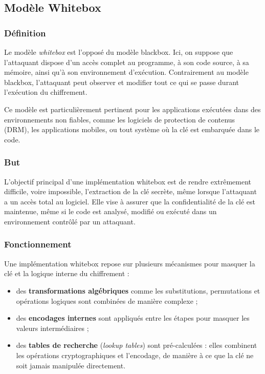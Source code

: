 \documentclass[a4paper, 10pt]{article}
\begin{document}
\vspace{0.5cm}

\subsection{Modèle Whitebox}

\subsubsection{Définition}

Le modèle \textit{whitebox} est l’opposé du modèle blackbox. Ici, on suppose que l’attaquant dispose d’un accès complet au programme, à son code source, à sa mémoire, ainsi qu'à son environnement d’exécution. Contrairement au modèle blackbox, l’attaquant peut observer et modifier tout ce qui se passe durant l’exécution du chiffrement.

Ce modèle est particulièrement pertinent pour les applications exécutées dans des environnements non fiables, comme les logiciels de protection de contenus (DRM), les applications mobiles, ou tout système où la clé est embarquée dans le code.

\subsubsection{But}

L’objectif principal d’une implémentation whitebox est de rendre extrêmement difficile, voire impossible, l’extraction de la clé secrète, même lorsque l’attaquant a un accès total au logiciel. Elle vise à assurer que la confidentialité de la clé est maintenue, même si le code est analysé, modifié ou exécuté dans un environnement contrôlé par un attaquant.

\subsubsection{Fonctionnement}

Une implémentation whitebox repose sur plusieurs mécanismes pour masquer la clé et la logique interne du chiffrement :

\begin{itemize}
  \item des \textbf{transformations algébriques} comme les substitutions, permutations et opérations logiques sont combinées de manière complexe ;
  \item des \textbf{encodages internes} sont appliqués entre les étapes pour masquer les valeurs intermédiaires ;
  \item des \textbf{tables de recherche} (\textit{lookup tables}) sont pré-calculées : elles combinent les opérations cryptographiques et l'encodage, de manière à ce que la clé ne soit jamais manipulée directement.
\end{itemize}
\end{document}
